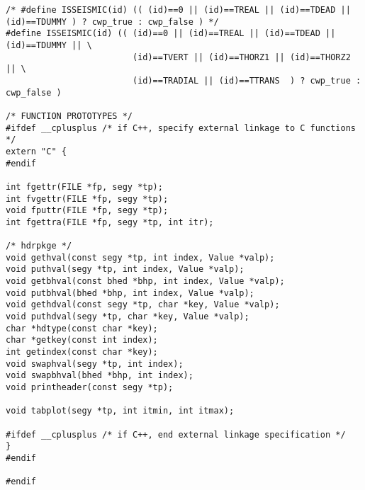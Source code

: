 {\begin{verbatim}
/* #define ISSEISMIC(id) (( (id)==0 || (id)==TREAL || (id)==TDEAD || (id)==TDUMMY ) ? cwp_true : cwp_false ) */
#define ISSEISMIC(id) (( (id)==0 || (id)==TREAL || (id)==TDEAD || (id)==TDUMMY || \
						 (id)==TVERT || (id)==THORZ1 || (id)==THORZ2 || \
						 (id)==TRADIAL || (id)==TTRANS  ) ? cwp_true : cwp_false ) 

/* FUNCTION PROTOTYPES */
#ifdef __cplusplus /* if C++, specify external linkage to C functions */
extern "C" {
#endif

int fgettr(FILE *fp, segy *tp);
int fvgettr(FILE *fp, segy *tp);
void fputtr(FILE *fp, segy *tp);
int fgettra(FILE *fp, segy *tp, int itr);

/* hdrpkge */
void gethval(const segy *tp, int index, Value *valp);
void puthval(segy *tp, int index, Value *valp);
void getbhval(const bhed *bhp, int index, Value *valp);
void putbhval(bhed *bhp, int index, Value *valp);
void gethdval(const segy *tp, char *key, Value *valp);
void puthdval(segy *tp, char *key, Value *valp);
char *hdtype(const char *key);
char *getkey(const int index);
int getindex(const char *key);
void swaphval(segy *tp, int index);
void swapbhval(bhed *bhp, int index);
void printheader(const segy *tp);

void tabplot(segy *tp, int itmin, int itmax);

#ifdef __cplusplus /* if C++, end external linkage specification */
}
#endif

#endif
\end{verbatim} }

